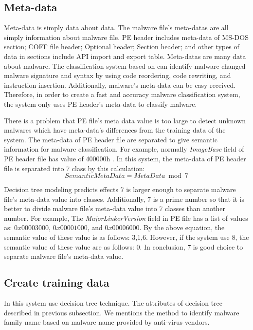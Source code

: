 \subsection{Meta-data}
Meta-data is simply data about data. The malware file's meta-datas are all simply information about malware file. PE header includes meta-data of MS-DOS section; COFF file header; Optional header; Section header; and other types of data in sections include API import and export table. Meta-datas are many data about malware. The classification system based on can identify malware changed malware signature and syntax by using code reordering, code rewriting, and instruction insertion. Additionally, malware's meta-data can be easy received. 
Therefore, in order to create a fast and accuracy malware classification system, the system only uses PE header's meta-data to classify malware.
 
There is a problem that PE file's meta data value is too large to detect unknown malwares which have meta-data's differences from the training data of the system. The meta-data of PE header file are separated  to give semantic information for malware classification. For example, normally \emph{ImageBase} field of PE header file has value of 400000h \cite{goppit}. In this system, the meta-data of PE header file is separated into $7$ class by this calculation:
\begin{equation}
SemanticMetaData = MetaData \bmod 7
\end{equation} 

Decision tree modeling predicts effects $7$ is larger enough to separate malware file's meta-data value into classes. Additionally, $7$ is a prime number so that it is better to divide malware file's meta-data value into $7$ classes than another number. For example, The \emph{MajorLinkerVersion} field in PE file has a list of values as: $0x00003000$, $0x00001000$, and $0x00006000$. By the above equation, the semantic value of these value is as follows: 3,1,6. However, if the system use $8$, the semantic value of these value are as follows: 0. In conclusion, $7$ is good choice to separate malware file's meta-data value.

\subsection{Create training data}

In this system use decision tree technique. The attributes of decision tree described in previous subsection. We mentions the method to identify malware family name based on malware name provided by anti-virus vendors.

